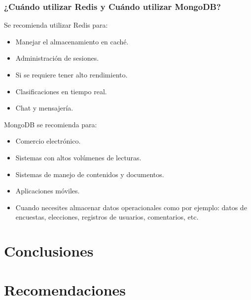 \documentclass[twoside,twocolumn]{article}
\begin{document}
\subsubsection{¿Cuándo utilizar Redis y Cuándo utilizar MongoDB?}
Se recomienda utilizar Redis para:
\begin{itemize}
    \item 	Manejar el almacenamiento en caché.
    \item	Administración de sesiones.
    \item	Si se requiere tener alto rendimiento.
    \item	Clasificaciones en tiempo real.
    \item	Chat y mensajería.
    
\end{itemize}
MongoDB se recomienda para:
\begin{itemize}
    \item 	Comercio electrónico.
    \item	Sistemas con altos volúmenes de lecturas.
    \item	Sistemas de manejo de contenidos y documentos.
    \item	Aplicaciones móviles.
    \item	Cuando necesites almacenar datos operacionales como por ejemplo: datos de encuestas, elecciones, registros de usuarios, comentarios, etc.
      
\end{itemize}
\section{Conclusiones}

\section{Recomendaciones}


\end{document}
